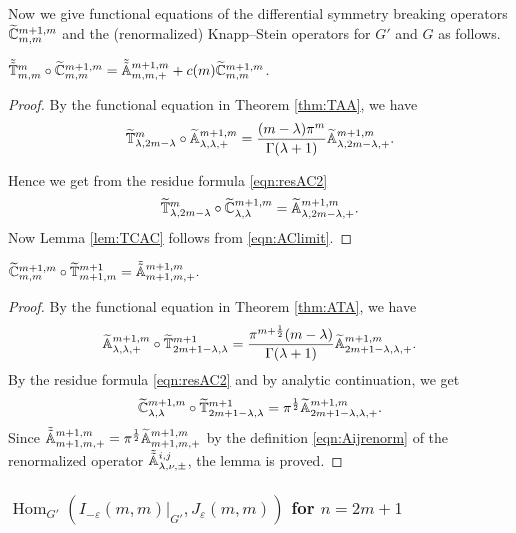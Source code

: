 Now we give functional equations
 of the differential symmetry breaking operators
 $\widetilde{{\mathbb{C}}}_{{m},{m}}^{{m+1,m}}$
 and the (renormalized) Knapp--Stein operators for $G'$ and $G$
 as follows.  


\begin{lemma}
\label{lem:TCAC}
$\tilde{\tilde{{\mathbb{T}}}}_{{m},{m}}^{{m}} \circ \widetilde{{\mathbb{C}}}_{{m},{m}}^{{m+1,m}}
=
\tilde{\tilde{{\mathbb{A}}}}_{{m},{m},{+}}^{{m+1,m}} + c(m) \widetilde{{\mathbb{C}}}_{{m},{m}}^{{m+1,m}}$.  
\end{lemma}
\begin{proof}
By the functional equation in Theorem \ref{thm:TAA}, 
 we have
\[
 \widetilde{{\mathbb{T}}}_{{\lambda},{2m-\lambda}}^{{m}}
 \circ 
 {\widetilde{\mathbb{A}}}_{{\lambda},{\lambda},{+}}^{{m+1,m}}
  = 
  \frac{(m-\lambda)\pi^{m}}{\Gamma(\lambda+1)}
  {\widetilde{\mathbb{A}}}_{{\lambda},{2m-\lambda},{+}}^{{m+1,m}}.  
\]

Hence we get from the residue formula \eqref{eqn:resAC2}
\[
  \widetilde{{\mathbb{T}}}_{{\lambda},{2m-\lambda}}^{{m}}
 \circ 
  \widetilde{{\mathbb{C}}}_{{\lambda},{\lambda}}^{{m+1,m}}
  = 
  {\widetilde{\mathbb{A}}}_{{\lambda},{2m-\lambda},{+}}^{{m+1,m}}.  
\]
Now Lemma \ref{lem:TCAC} follows from \eqref{eqn:AClimit}.  
\end{proof}



\begin{lemma}
\label{lem:CTAtilde}
$
\widetilde{{\mathbb{C}}}_{{m},{m}}^{{m+1,m}} \circ \widetilde{{\mathbb{T}}}_{{m+1},{m}}^{{m+1}} 
=
\tilde{\tilde{{\mathbb{A}}}}_{{m+1},{m},{+}}^{{m+1,m}}.  
$
\end{lemma}
\begin{proof}
By the functional equation in Theorem \ref{thm:ATA}, 
 we have
\[
 {\widetilde{\mathbb{A}}}_{{\lambda},{\lambda},{+}}^{{m+1,m}}
 \circ 
 \widetilde{{\mathbb{T}}}_{{2m+1-\lambda},{\lambda}}^{{m+1}}
 = 
  \frac{\pi^{m+\frac 1 2}(m-\lambda)}{\Gamma(\lambda+1)}
  {\widetilde{\mathbb{A}}}_{{2m+1-\lambda},{\lambda},{+}}^{{m+1,m}}.  
\]
By the residue formula \eqref{eqn:resAC2}
 and by analytic continuation, 
 we get 
\[
  \widetilde{{\mathbb{C}}}_{{\lambda},{\lambda}}^{{m+1,m}}
  \circ 
  \widetilde{{\mathbb{T}}}_{{2m+1-\lambda},{\lambda}}^{{m+1}}
  = 
  \pi^{\frac 12}{\widetilde{\mathbb{A}}}_{{2m+1-\lambda},{\lambda},{+}}^{{m+1,m}}.  
\]
Since $\tilde{\tilde{{\mathbb{A}}}}_{{m+1},{m},{+}}^{{m+1,m}} = \pi^{\frac 1 2} {\widetilde{\mathbb{A}}}_{{m+1},{m},{+}}^{{m+1,m}}$
 by the definition \eqref{eqn:Aijrenorm}
 of the renormalized operator $\tilde{\tilde{{\mathbb{A}}}}_{{\lambda},{\nu},{\pm}}^{{i,j}}$, 
 the lemma is proved.  
\end{proof}


\subsubsection
{${\operatorname{Hom}}_{G'}(I_{-\varepsilon}(m,m)|_{G'}, J_{\varepsilon}(m,m))$
 for $n=2m+1$}
\label{subsec:IJnoddmm-}


